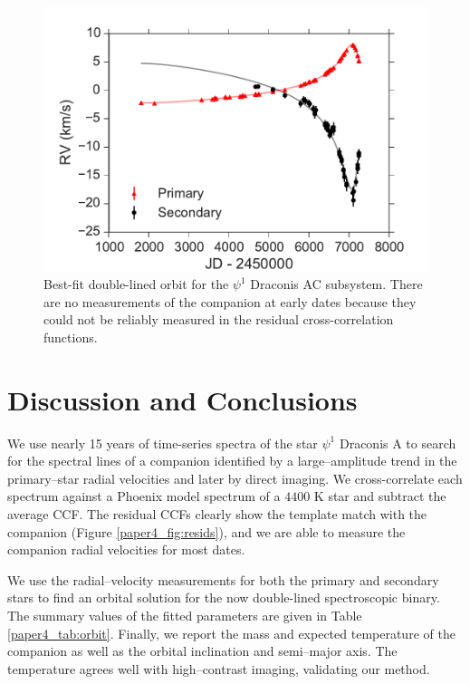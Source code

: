 \begin{figure}[t]

  \includegraphics[width=\columnwidth]{Figures/paper4_SB2_Orbit.pdf}
  \caption{Best-fit double-lined orbit for the $\psi^1$ Draconis AC subsystem. There are no measurements of the companion at early dates because they could not be reliably measured in the residual cross-correlation functions.}
  \label{paper4_fig:orbit}
  
\end{figure}



\section{Discussion and Conclusions}

We use nearly 15 years of time-series spectra of the star $\psi^1$ Draconis A to search for the spectral lines of a companion identified by a large--amplitude trend in the primary--star radial velocities and later by direct imaging. We cross-correlate each spectrum against a Phoenix model spectrum of a $4400$ K star and subtract the average CCF. The residual CCFs clearly show the template match with the companion (Figure \ref{paper4_fig:resids}), and we are able to measure the companion radial velocities for most dates. 

We use the radial--velocity measurements for both the primary and secondary stars to find an orbital solution for the now double-lined spectroscopic binary. The summary values of the fitted parameters are given in Table \ref{paper4_tab:orbit}. Finally, we report the mass and expected temperature of the companion as well as the orbital inclination and semi--major axis. The temperature agrees well with high--contrast imaging, validating our method.

